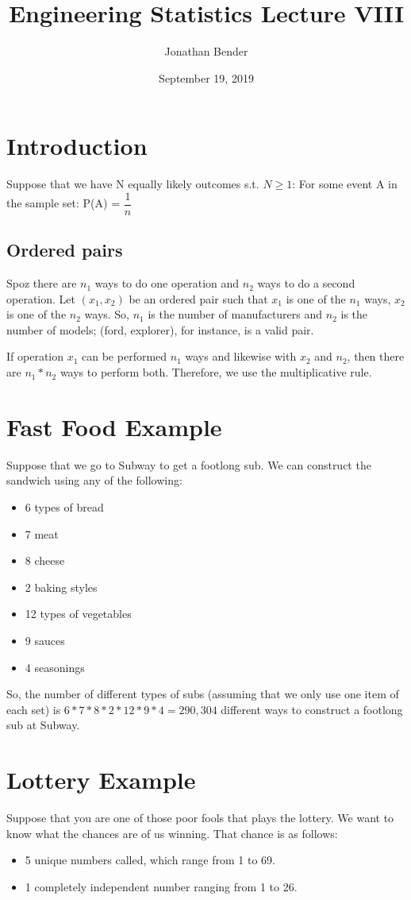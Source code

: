 \documentclass[]{article}
\title{Engineering Statistics Lecture VIII}
\author{Jonathan Bender}
\date{September 19, 2019}
\begin{document}
\maketitle

\begin{abstract}
\end{abstract}

\section{Introduction}
Suppose that we have N equally likely outcomes s.t. $N \geq 1$:
For some event A in the sample set:
P(A) = $\dfrac{1}{n}$

\subsection{Ordered pairs}

Spoz there are $n_1$ ways to do one operation and $n_2$ ways to do a second operation. Let $(x_1, x_2)$ be an ordered pair such that $x_1$ is one of the $n_1$ ways, $x_2$ is one of the $n_2$ ways. So, $n_1$ is the number of manufacturers and $n_2$ is the number of models; (ford, explorer), for instance, is a valid pair.

If operation $x_1$ can be performed $n_1$ ways and likewise with $x_2$ and $n_2$, then there are $n_1 * n_2$ ways to perform both. Therefore, we use the multiplicative rule.

\section{Fast Food Example}
Suppose that we go to Subway to get a footlong sub. We can construct the sandwich using any of the following:
\begin{itemize}
	\item 6 types of bread
	\item 7 meat
	\item 8 cheese
	\item 2 baking styles
	\item 12 types of vegetables
	\item 9 sauces
	\item 4 seasonings
\end{itemize}
So, the number of different types of subs (assuming that we only use one item of each set) is $6 * 7 * 8 * 2 * 12 * 9 * 4 = 290,304$ different ways to construct a footlong sub at Subway.
\section{Lottery Example}
Suppose that you are one of those poor fools that plays the lottery. We want to know what the chances are of us winning. That chance is as follows:
\begin{itemize}
	\item 5 unique numbers called, which range from 1 to 69.
	\item 1 completely independent number ranging from 1 to 26.
\end{itemize}
\end{document}
